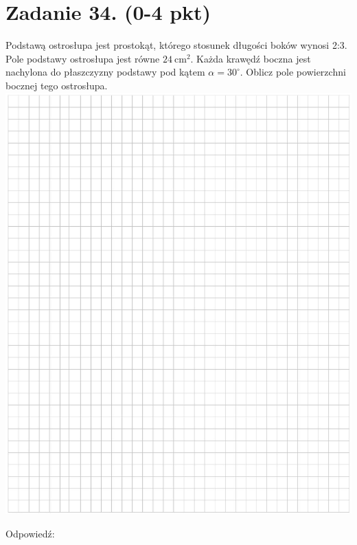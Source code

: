 \documentclass[10pt]{article}
\begin{document}
\section*{Zadanie 34. (0-4 pkt)}
Podstawą ostrosłupa jest prostokąt, którego stosunek długości boków wynosi 2:3. Pole podstawy ostrosłupa jest równe \(24 \mathrm{~cm}^{2}\). Każda krawędź boczna jest nachylona do płaszczyzny podstawy pod kątem \(\alpha=30^{\circ}\). Oblicz pole powierzchni bocznej tego ostrosłupa.\\
\includegraphics[max width=\textwidth, center]{2024_11_21_b8ac5f500a5bbb1b4ec5g-17}

Odpowiedź:
\end{document}
